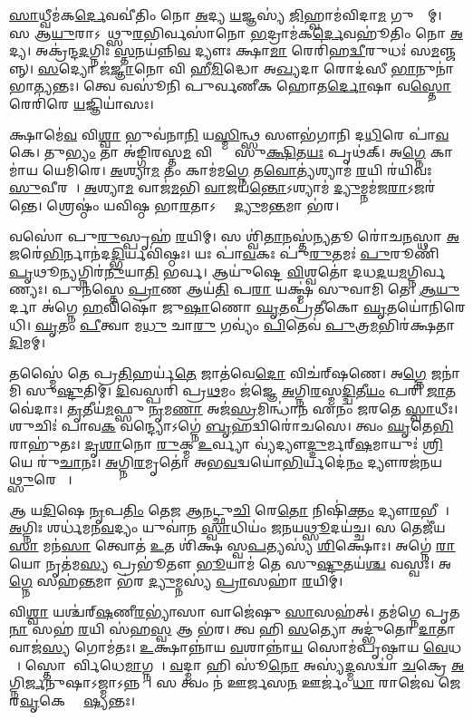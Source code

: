 \ul{𑌸𑌾}𑌧𑍍𑌵𑍀𑌮॑𑌕\ul{𑌰𑍍𑌦𑍇}𑌵𑌵𑍀॑𑌤𑌿𑌂 𑌨𑍋 \ul{𑌅}𑌦𑍍𑌯 \ul{𑌯}𑌜𑍍𑌞𑌸𑍍𑌯॑ \ul{𑌜𑌿}𑌹𑍍𑌵𑌾𑌮॑𑌵𑌿𑌦𑌾\ul{𑌮} 𑌗𑍁𑌹𑍍𑌯𑌾᳚𑌮𑍍। 𑌸 𑌆\ul{𑌯𑍁}𑌰𑌾𑌽𑌗𑌾᳚𑌥𑍍𑌸𑍁\ul{𑌰}𑌭𑌿𑌰𑍍𑌵𑌸𑌾॑𑌨𑍋 \ul{𑌭}𑌦𑍍𑌰𑌾𑌮॑𑌕\ul{𑌰𑍍𑌦𑍇}𑌵𑌹𑍂॑𑌤𑌿𑌂 𑌨𑍋 \ul{𑌅}𑌦𑍍𑌯। 𑌅𑌕𑍍𑌰॑𑌨𑍍𑌦\ul{𑌦}𑌗𑍍𑌨𑌿𑌃 \ul{𑌸𑍍𑌤}𑌨𑌯॑𑌨𑍍𑌨𑌿\ul{𑌵} 𑌦𑍍𑌯𑍗𑌃 𑌕𑍍𑌷𑌾\ul{𑌮𑌾} 𑌰𑍇𑌰𑌿॑𑌹\ul{𑌦𑍍𑌵𑍀}𑌰𑍁𑌧𑌃॑ 𑌸\ul{𑌮}𑌞𑍍𑌜𑌨𑍍𑌨𑍍। \ul{𑌸}𑌦𑍍𑌯𑍋 𑌜॑\ul{𑌜𑍍𑌞𑌾}𑌨𑍋 𑌵𑌿 𑌹𑍀\ul{𑌮𑌿}𑌦𑍍𑌧𑍋 𑌅\ul{𑌖𑍍𑌯}𑌦𑌾 𑌰𑍋𑌦॑𑌸𑍀 \ul{𑌭𑌾}𑌨𑍁𑌨𑌾॑ 𑌭𑌾\ul{𑌤𑍍𑌯}𑌨𑍍𑌤𑌃। 𑌤𑍍𑌵𑍇 𑌵𑌸𑍂॑𑌨𑌿 𑌪𑍁𑌰𑍍𑌵𑌣𑍀𑌕 𑌹𑍋𑌤\ul{𑌰𑍍𑌦𑍋}𑌷𑌾 𑌵\ul{𑌸𑍍𑌤𑍋}𑌰𑍇𑌰𑌿॑𑌰𑍇 \ul{𑌯}𑌜𑍍𑌞𑌿𑌯𑌾॑𑌸𑌃। 

𑌕𑍍𑌷𑌾𑌮𑍇॑\ul{𑌵} 𑌵𑌿\ul{𑌶𑍍𑌵𑌾} 𑌭𑍁𑌵॑𑌨𑌾\ul{𑌨𑌿} 𑌯\ul{𑌸𑍍𑌮𑌿}𑌨𑍍𑌥𑍍𑌸 𑌸𑍗𑌭॑𑌗𑌾𑌨𑌿 𑌦\ul{𑌧𑌿}𑌰𑍇 𑌪𑌾॑\ul{𑌵}𑌕𑍇। 𑌤𑍁\ul{𑌭𑍍𑌯𑌂} 𑌤𑌾 𑌅॑𑌙𑍍𑌗𑌿𑌰𑌸𑍍𑌤\ul{𑌮} 𑌵𑌿𑌶𑍍𑌵𑌾𑌃᳚ 𑌸𑍁\ul{𑌕𑍍𑌷𑌿}𑌤\ul{𑌯𑌃} 𑌪𑍃𑌥॑𑌕𑍍। 𑌅\ul{𑌗𑍍𑌨𑍇} 𑌕𑌾𑌮𑌾॑𑌯 𑌯𑍇𑌮𑌿𑌰𑍇। \ul{𑌅}𑌶𑍍𑌯𑌾\ul{𑌮} 𑌤𑌂 𑌕𑌾𑌮॑𑌮\ul{𑌗𑍍𑌨𑍇} 𑌤\ul{𑌵𑍋}𑌤𑍍𑌯॑𑌶𑍍𑌯𑌾𑌮॑ \ul{𑌰}𑌯𑌿 𑌰॑𑌯𑌿𑌵𑌃 \ul{𑌸𑍁}𑌵𑍀𑌰𑌮𑍍᳚। \ul{𑌅}𑌶𑍍𑌯𑌾\ul{𑌮} 𑌵𑌾𑌜॑\ul{𑌮}𑌭𑌿 \ul{𑌵𑌾}𑌜𑌯॑\ul{𑌨𑍍𑌤𑍋}𑌽𑌶𑍍𑌯𑌾𑌮॑ \ul{𑌦𑍍𑌯𑍁}𑌮𑍍𑌨𑌮॑𑌜\ul{𑌰𑌾}𑌽𑌜𑌰॑𑌨𑍍𑌤𑍇। 𑌶𑍍𑌰𑍇𑌷𑍍𑌠𑌂॑ 𑌯𑌵𑌿𑌷𑍍𑌠 𑌭𑌾\ul{𑌰}𑌤𑌾𑌽𑌗𑍍𑌨𑍇᳚ \ul{𑌦𑍍𑌯𑍁}𑌮\ul{𑌨𑍍𑌤}𑌮𑌾 𑌭॑𑌰। 

𑌵𑌸𑍋॑ 𑌪𑍁\ul{𑌰𑍁}𑌸𑍍𑌪𑍃𑌹॑ \ul{𑌰}𑌯𑌿𑌮𑍍। 𑌸 𑌶𑍍𑌵𑌿॑\ul{𑌤𑌾}𑌨𑌸𑍍𑌤॑\ul{𑌨𑍍𑌯}𑌤𑍂 𑌰𑍋॑𑌚\ul{𑌨}𑌸𑍍𑌥𑌾 \ul{𑌅}𑌜𑌰𑍇॑\ul{𑌭𑌿}𑌰𑍍𑌨𑌾𑌨॑𑌦\ul{𑌦𑍍𑌭𑌿}𑌰𑍍𑌯𑌵𑌿॑𑌷𑍍𑌠𑌃। 𑌯𑌃 𑌪𑌾॑\ul{𑌵}𑌕𑌃 𑌪𑍁॑\ul{𑌰𑍁}𑌤𑌮𑌃॑ \ul{𑌪𑍁}𑌰𑍂𑌣𑌿॑ \ul{𑌪𑍃}𑌥𑍂\ul{𑌨𑍍𑌯}𑌗𑍍𑌨𑌿𑌰॑\ul{𑌨𑍁}𑌯𑌾\ul{𑌤𑌿} 𑌭𑌰𑍍𑌵\snn{}। 𑌆𑌯𑍁॑𑌷𑍍𑌟𑍇 \ul{𑌵𑌿}𑌶𑍍𑌵𑌤𑍋॑ 𑌦𑌧\ul{𑌦}𑌯\ul{𑌮}𑌗𑍍𑌨𑌿𑌰𑍍𑌵𑌰𑍇᳚𑌣𑍍𑌯𑌃। 𑌪𑍁𑌨॑𑌸𑍍𑌤𑍇 \ul{𑌪𑍍𑌰𑌾}𑌣 𑌆𑌯॑\ul{𑌤𑌿} 𑌪\ul{𑌰𑌾} 𑌯𑌕𑍍𑌷𑍍𑌮॑ 𑌸𑍁𑌵𑌾𑌮𑌿 𑌤𑍇। \ul{𑌆}\ul{𑌯𑍁}𑌰𑍍𑌦𑌾 𑌅॑𑌗𑍍𑌨𑍇 \ul{𑌹}𑌵𑌿𑌷𑍋॑ 𑌜𑍁\ul{𑌷𑌾}𑌣𑍋 \ul{𑌘𑍃}𑌤𑌪𑍍𑌰॑𑌤𑍀𑌕𑍋 \ul{𑌘𑍃}𑌤𑌯𑍋॑𑌨𑌿𑌰𑍇𑌧𑌿। \ul{𑌘𑍃}𑌤𑌂 \ul{𑌪𑍀}𑌤𑍍𑌵𑌾 𑌮\ul{𑌧𑍁} 𑌚𑌾\ul{𑌰𑍁} 𑌗𑌵𑍍𑌯𑌂॑ \ul{𑌪𑌿}𑌤𑍇𑌵॑ \ul{𑌪𑍁}𑌤𑍍𑌰\ul{𑌮}𑌭𑌿𑌰॑𑌕𑍍𑌷𑌤𑌾\ul{𑌦𑌿}𑌮𑌮𑍍।

𑌤𑌸𑍍𑌮𑍈॑ 𑌤𑍇 𑌪𑍍𑌰\ul{𑌤𑌿}𑌹𑌰𑍍𑌯॑\ul{𑌤𑍇} 𑌜𑌾𑌤॑𑌵𑍇\ul{𑌦𑍋} 𑌵𑌿𑌚॑𑌰𑍍‌𑌷𑌣𑍇। 𑌅\ul{𑌗𑍍𑌨𑍇} 𑌜𑌨𑌾॑𑌮𑌿 𑌸𑍁\ul{𑌷𑍍𑌟𑍁}𑌤𑌿𑌮𑍍। \ul{𑌦𑌿}𑌵𑌸𑍍𑌪𑌰𑌿॑ 𑌪𑍍𑌰\ul{𑌥}𑌮𑌂 𑌜॑𑌜𑍍𑌞𑍇 \ul{𑌅}𑌗𑍍𑌨𑌿\ul{𑌰}𑌸𑍍𑌮\ul{𑌦𑍍𑌦𑍍𑌵𑌿}𑌤𑍀\ul{𑌯𑌂} 𑌪𑌰𑌿॑ \ul{𑌜𑌾}𑌤𑌵𑍇॑𑌦𑌾𑌃। \ul{𑌤𑍃}𑌤𑍀𑌯॑\ul{𑌮}𑌫𑍍𑌸𑍁 \ul{𑌨𑍃}𑌮\ul{𑌣𑌾} 𑌅𑌜॑\ul{𑌸𑍍𑌰}𑌮𑌿𑌨𑍍𑌧𑌾॑𑌨 𑌏𑌨𑌂 𑌜𑌰𑌤𑍇 \ul{𑌸𑍍𑌵𑌾}𑌧𑍀𑌃। 𑌶𑍁𑌚𑌿𑌃॑ 𑌪𑌾𑌵\ul{𑌕} 𑌵𑌨𑍍𑌦𑍍𑌯𑍋𑌽𑌗𑍍𑌨𑍇॑ \ul{𑌬𑍃}𑌹𑌦𑍍𑌵𑌿𑌰𑍋॑𑌚𑌸𑍇। 𑌤𑍍𑌵𑌂 \ul{𑌘𑍃}𑌤𑍇\ul{𑌭𑌿}𑌰𑌾𑌹𑍁॑𑌤𑌃। \ul{𑌦𑍃}\ul{𑌶𑌾}𑌨𑍋 \ul{𑌰𑍁}𑌕𑍍𑌮 \ul{𑌉}𑌰𑍍𑌵𑍍𑌯𑌾 𑌵𑍍𑌯॑𑌦𑍍𑌯𑍗\ul{𑌦𑍍𑌦𑍁}𑌰𑍍𑌮𑌰𑍍‌\ul{𑌷}𑌮𑌾𑌯𑍁𑌃॑ \ul{𑌶𑍍𑌰𑌿}𑌯𑍇 𑌰𑍁॑\ul{𑌚𑌾}𑌨𑌃। \ul{𑌅}𑌗𑍍𑌨𑌿\ul{𑌰}𑌮𑍃𑌤𑍋॑ 𑌅𑌭\ul{𑌵}𑌦𑍍𑌵𑌯𑍋॑\ul{𑌭𑌿}𑌰𑍍𑌯𑌦𑍇॑\ul{𑌨𑌂} 𑌦𑍍𑌯𑍗𑌰𑌜॑𑌨𑌯\ul{𑌥𑍍𑌸𑍁}𑌰𑍇𑌤𑌾𑌃᳚। 

𑌆 𑌯\ul{𑌦𑌿}𑌷𑍇 \ul{𑌨𑍃}𑌪\ul{𑌤𑌿𑌂} 𑌤𑍇\ul{𑌜} 𑌆\ul{𑌨}𑌟𑍍𑌛𑍁\ul{𑌚𑌿} 𑌰𑍇\ul{𑌤𑍋} 𑌨𑌿𑌷𑌿॑\ul{𑌕𑍍𑌤𑌂} 𑌦𑍍𑌯𑍗\ul{𑌰}𑌭𑍀𑌕𑍇᳚।
\ul{𑌅}𑌗𑍍𑌨𑌿𑌃 𑌶𑌰𑍍𑌧॑𑌮𑌨\ul{𑌵}𑌦𑍍𑌯𑌂 𑌯𑍁𑌵𑌾॑𑌨 \ul{𑌸𑍍𑌵𑌾}𑌧𑌿𑌯𑌂॑ 𑌜𑌨𑌯\ul{𑌥𑍍𑌸𑍂}𑌦𑌯॑𑌚𑍍𑌚। 𑌸 𑌤𑍇𑌜𑍀॑𑌯\ul{𑌸𑌾} 𑌮𑌨॑\ul{𑌸𑌾} 𑌤𑍍𑌵𑍋𑌤॑ \ul{𑌉}𑌤 𑌶𑌿॑𑌕𑍍𑌷 𑌸𑍍𑌵\ul{𑌪}𑌤𑍍𑌯𑌸𑍍𑌯॑ \ul{𑌶𑌿}𑌕𑍍𑌷𑍋𑌃। 𑌅𑌗𑍍𑌨𑍇॑ \ul{𑌰𑌾}𑌯𑍋 𑌨𑍃𑌤॑𑌮\ul{𑌸𑍍𑌯} 𑌪𑍍𑌰𑌭𑍂॑𑌤𑍗 \ul{𑌭𑍂}𑌯𑌾𑌮॑ 𑌤𑍇 𑌸𑍁\ul{𑌷𑍍𑌟𑍁}𑌤𑌯॑\ul{𑌶𑍍𑌚} 𑌵𑌸𑍍𑌵𑌃॑। 𑌅\ul{𑌗𑍍𑌨𑍇} 𑌸𑌹॑\ul{𑌨𑍍𑌤}𑌮𑌾 𑌭॑𑌰 \ul{𑌦𑍍𑌯𑍁}𑌮𑍍𑌨𑌸𑍍𑌯॑ \ul{𑌪𑍍𑌰𑌾}𑌸𑌹𑌾॑ \ul{𑌰}𑌯𑌿𑌮𑍍।

 𑌵𑌿\ul{𑌶𑍍𑌵𑌾} 𑌯𑌶𑍍𑌚॑𑌰𑍍‌\ul{𑌷}𑌣𑍀\ul{𑌰}𑌭𑍍𑌯𑌾॑𑌸𑌾 𑌵𑌾𑌜𑍇॑𑌷𑍁 \ul{𑌸𑌾}𑌸𑌹॑𑌤𑍍। 
𑌤𑌮॑𑌗𑍍𑌨𑍇 𑌪𑍃𑌤\ul{𑌨𑌾} 𑌸𑌹॑ \ul{𑌰}𑌯𑌿 𑌸॑𑌹\ul{𑌸𑍍𑌵} 𑌆 𑌭॑𑌰। 𑌤𑍍𑌵 𑌹𑌿 \ul{𑌸}𑌤𑍍𑌯𑍋 𑌅𑌦𑍍𑌭𑍁॑𑌤𑍋 \ul{𑌦𑌾}𑌤𑌾 𑌵𑌾𑌜॑\ul{𑌸𑍍𑌯} 𑌗𑍋𑌮॑𑌤𑌃। \ul{𑌉}𑌕𑍍𑌷𑌾𑌨𑍍𑌨𑌾॑𑌯 \ul{𑌵}𑌶𑌾𑌨𑍍𑌨𑌾॑\ul{𑌯} 𑌸𑍋𑌮॑𑌪𑍃𑌷𑍍𑌠𑌾𑌯 \ul{𑌵𑍇}𑌧𑌸𑍇᳚। 𑌸𑍍𑌤𑍋𑌮𑍈᳚𑌰𑍍𑌵𑌿𑌧𑍇\ul{𑌮𑌾}𑌗𑍍𑌨𑌯𑍇᳚। \ul{𑌵}𑌦𑍍𑌮𑌾 𑌹𑌿 𑌸𑍂॑\ul{𑌨𑍋} 𑌅𑌸𑍍𑌯॑\ul{𑌦𑍍𑌮}𑌸𑌦𑍍𑌵𑌾॑ \ul{𑌚}𑌕𑍍𑌰𑍇 \ul{𑌅}𑌗𑍍𑌨𑌿\ul{𑌰𑍍𑌜}𑌨𑍁𑌷𑌾𑌽𑌜𑍍𑌮𑌾𑌽𑌨𑍍𑌨𑌮𑍍᳚। 𑌸 𑌤𑍍𑌵𑌂 𑌨॑ 𑌊𑌰𑍍𑌜𑌸\ul{𑌨} 𑌊𑌰𑍍𑌜𑌂॑ \ul{𑌧𑌾}  𑌰𑌾𑌜𑍇॑𑌵 𑌜𑍇𑌰\ul{𑌵𑍃}𑌕𑍇 𑌕𑍍𑌷𑍇᳚\ul{𑌷𑍍𑌯}𑌨𑍍𑌤𑌃।

